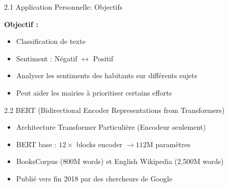 \documentclass[12pt]{beamer}
\begin{document}

\begin{frame}{2.1 Application Personnelle: Objectifs}

\textbf{Objectif :}
\begin{itemize}
	\item Classification de texte
	\item Sentiment : Négatif $\longleftrightarrow$ Positif
	\item Analyser les sentiments des habitants sur différents sujets
	\item Peut aider les mairies à prioritiser certains efforts
\end{itemize}


\end{frame}



\begin{frame}{2.2 BERT (Bidirectional Encoder Representations from Transformers)}

\begin{itemize}
	\item Architecture Transformer Particulière (Encodeur seulement)
	\item BERT base : $12 \times$ blocks encoder $\to 112$M paramètres 
	\item BooksCorpus (800M words) et English Wikipedia (2,500M words)
	\item Publié vers fin 2018 par des chercheurs de Google
\end{itemize}

\end{frame}


\end{document}
